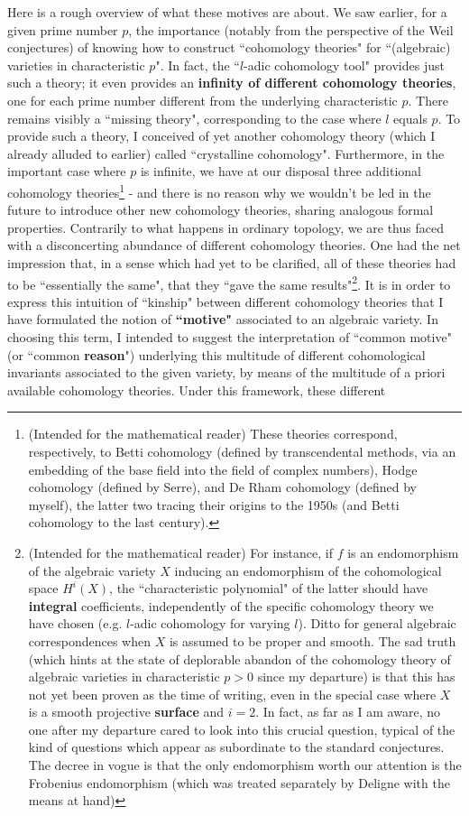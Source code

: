 Here is a rough overview of what these motives are about. We saw earlier, for a given prime number $p$, the importance (notably from the perspective of the Weil conjectures) of knowing how to construct ``cohomology theories" for ``(algebraic) varieties in characteristic $p$". In fact, the ``$l$-adic cohomology tool" provides just such a theory; it even provides an \textbf{infinity of different cohomology theories}, one for each prime number different from the underlying characteristic $p$. There remains visibly a ``missing theory", corresponding to the case where $l$ equals $p$. To provide such a theory, I conceived of yet another cohomology theory (which I already alluded to earlier) called ``crystalline cohomology". Furthermore, in the important case where $p$ is infinite, we have at our disposal three additional cohomology theories\footnote{(Intended for the mathematical reader) These theories correspond, respectively, to Betti cohomology (defined by transcendental methods, via an embedding of the base field into the field of complex numbers), Hodge cohomology (defined by Serre), and De Rham cohomology (defined by myself), the latter two tracing their origins to the 1950s (and Betti cohomology to the last century).} - and there is no reason why we wouldn't be led in the future to introduce other new cohomology theories, sharing analogous formal properties. Contrarily to what happens in ordinary topology, we are thus faced with a disconcerting abundance of different cohomology theories. One had the net impression that, in a sense which had yet to be clarified, all of these theories had to be ``essentially the same", that they ``gave the same results"\footnote{(Intended for the mathematical reader) For instance, if $f$ is an endomorphism of the algebraic variety $X$ inducing an endomorphism of the cohomological space $H^i(X)$, the ``characteristic polynomial" of the latter should have \textbf{integral} coefficients, independently of the specific cohomology theory we have chosen (e.g. $l$-adic cohomology for varying $l$). Ditto for general algebraic correspondences when $X$ is assumed to be proper and smooth. The sad truth (which hints at the state of deplorable abandon of the cohomology theory of algebraic varieties in characteristic $p > 0$ since my departure) is that this has not yet been proven as the time of writing, even in the special case where $X$ is a smooth projective \textbf{surface} and $i=2$. In fact, as far as I am aware, no one after my departure cared to look into this crucial question, typical of the kind of questions which appear as subordinate to the standard conjectures. The decree in vogue is that the only endomorphism worth our attention is the Frobenius endomorphism (which was treated separately by Deligne with the means at hand)}. It is in order to express this intuition of ``kinship" between different cohomology theories that I have formulated the notion of \textbf{``motive"} associated to an algebraic variety. In choosing this term, I intended to suggest the interpretation of ``common motive" (or ``common \textbf{reason}") underlying this multitude of different cohomological invariants associated to the given variety, by means of the multitude of a priori available cohomology theories. Under this framework, these different 